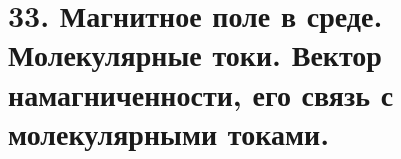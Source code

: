 \section*{33. Магнитное поле в среде. Молекулярные токи. Вектор намагниченности,
его связь с молекулярными токами.}